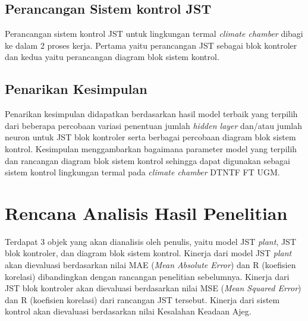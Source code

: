 \subsection{Perancangan Sistem kontrol JST}
Perancangan sistem kontrol JST untuk lingkungan termal \textit{climate chamber} dibagi ke dalam 2 proses kerja. Pertama yaitu perancangan JST sebagai blok kontroler dan kedua yaitu perancangan diagram blok sistem kontrol.

\subsection{{Penarikan Kesimpulan}}
Penarikan kesimpulan didapatkan berdasarkan hasil model terbaik yang terpilih dari beberapa percobaan variasi penentuan jumlah \textit{hidden layer} dan/atau jumlah neuron untuk JST blok kontroler serta berbagai percobaan diagram blok sistem kontrol. Kesimpulan menggambarkan bagaimana parameter model yang terpilih dan rancangan diagram blok sistem kontrol sehingga dapat digunakan sebagai sistem kontrol lingkungan termal pada \textit{climate chamber} DTNTF FT UGM.

\section{Rencana Analisis Hasil Penelitian}
Terdapat 3 objek yang akan dianalisis oleh penulis, yaitu model JST \textit{plant}, JST blok kontroler, dan diagram blok sistem kontrol. Kinerja dari model JST \textit{plant} akan dievaluasi berdasarkan nilai MAE (\textit{Mean Absolute Error}) dan R (koefisien korelasi) dibandingkan dengan rancangan penelitian sebelumnya. Kinerja dari JST blok kontroler akan dievaluasi berdasarkan nilai MSE (\textit{Mean Squared Error}) dan R (koefisien korelasi) dari rancangan JST tersebut. Kinerja dari sistem kontrol akan dievaluasi berdasarkan nilai Kesalahan Keadaan Ajeg.